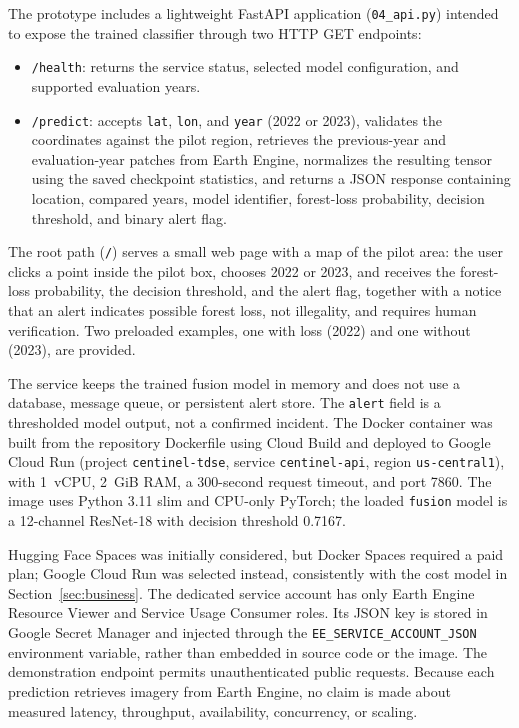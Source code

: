 \documentclass{article}
\begin{document}
The prototype includes a lightweight FastAPI application (\texttt{04\_api.py}) intended to expose the trained classifier through two HTTP GET endpoints:

\begin{itemize}
    \item \texttt{/health}: returns the service status, selected model configuration, and supported evaluation years.
    \item \texttt{/predict}: accepts \texttt{lat}, \texttt{lon}, and \texttt{year} (2022 or 2023), validates the coordinates against the pilot region, retrieves the previous-year and evaluation-year patches from Earth Engine, normalizes the resulting tensor using the saved checkpoint statistics, and returns a JSON response containing location, compared years, model identifier, forest-loss probability, decision threshold, and binary alert flag.
\end{itemize}

The root path (\texttt{/}) serves a small web page with a map of the pilot area: the user clicks a point inside the pilot box, chooses 2022 or 2023, and receives the forest-loss probability, the decision threshold, and the alert flag, together with a notice that an alert indicates possible forest loss, not illegality, and requires human verification. Two preloaded examples, one with loss (2022) and one without (2023), are provided.

The service keeps the trained fusion model in memory and does not use a database, message queue, or persistent alert store. The \texttt{alert} field is a thresholded model output, not a confirmed incident. The Docker container was built from the repository Dockerfile using Cloud Build and deployed to Google Cloud Run (project \texttt{centinel-tdse}, service \texttt{centinel-api}, region \texttt{us-central1}), with 1~vCPU, 2~GiB RAM, a 300-second request timeout, and port 7860. The image uses Python 3.11 slim and CPU-only PyTorch; the loaded \texttt{fusion} model is a 12-channel ResNet-18 with decision threshold 0.7167.

Hugging Face Spaces was initially considered, but Docker Spaces required a paid plan; Google Cloud Run was selected instead, consistently with the cost model in Section~\ref{sec:business}. The dedicated service account has only Earth Engine Resource Viewer and Service Usage Consumer roles. Its JSON key is stored in Google Secret Manager and injected through the \texttt{EE\_SERVICE\_ACCOUNT\_JSON} environment variable, rather than embedded in source code or the image. The demonstration endpoint permits unauthenticated public requests. Because each prediction retrieves imagery from Earth Engine, no claim is made about measured latency, throughput, availability, concurrency, or scaling.
\end{document}
